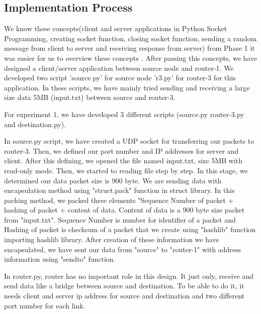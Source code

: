 \documentclass[letterpaper, 12 pt, conference]{ieeeconf}  %
\begin{document}
\subsection{Implementation Process}
We know these concepts(client and server applications in Python Socket Programming, creating socket function, closing socket function, sending a random message from client to server and receiving response from server) from Phase 1 it was easier for us to overview these concepts . After passing this concepts, we have designed a client/server application between source node and router-1. We developed two script 'source.py' for source node 'r3.py' for router-3 for this application. In these scripts, we have mainly tried sending and receiving a large size data 5MB (input.txt) between source and router-3. 
\vspace{1cm}

For experiment 1, we have developed 3 different scripts (source.py router-3.py and destination.py).
\vspace{1cm}

In source.py script, we have created a UDP socket for transferring our packets to router-3. Then, we defined our port number and IP addresses for server and client. After this defining, we opened the file named input.txt, size 5MB with read-only mode. Then, we started to reading file step by step. In this stage, we determined our data packet size is 900 byte. We are sending data with encapsulation method using "struct.pack" function in struct library. In this packing method, we packed three elements "Sequence Number of packet + hashing of packet + content of data. Content of data is a 900 byte size packet from "input.txt". Sequence Number is number for identifier of a packet and Hashing of packet is checksum of a packet that we create using "hashlib" function importing hashlib library. After creation of these information we have encapsulated, we have sent our data from "source" to "router-1" with address information using "sendto" function.
\vspace{1cm}

In router.py, router has no important role in this design. It just only, receive and send data like a bridge between source and destination. To be able to do it, it needs client and server ip address for source and destination and two different port number for each link.
\vspace{1cm}
\end{document}

